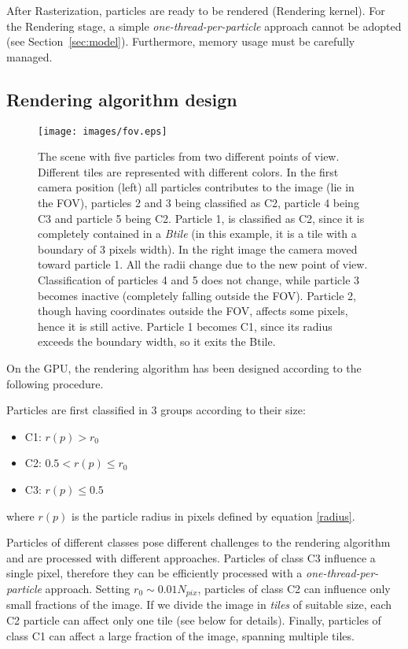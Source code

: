 \documentclass[11pt]{article}
\begin{document}
After Rasterization, particles are ready to be rendered (Rendering kernel).
For the Rendering stage, a simple {\it one-thread-per-particle} approach
cannot be adopted (see Section~\ref{sec:model}). Furthermore, memory usage must be carefully managed.

\subsection{Rendering algorithm design}
\label{sec:design}

\begin{figure}
\centering
\texttt{[image: images/fov.eps]}
\caption{The scene with five particles from two different points of view. Different tiles are 
represented with different colors. In the first camera position
(left) all particles contributes to the image (lie in the FOV), particles 2 and 3
being classified as C2, particle 4 being C3 and particle 5 being C2. Particle 1, is classified
as C2, since it is completely contained in a {\it Btile} (in this example, it is a tile with a boundary of 3 pixels width). In the right
image the camera moved toward particle 1. All the radii change due to the new point
of view. Classification of particles 4 and 5 does not change, while particle 3 
becomes inactive (completely falling outside the FOV). Particle 2, though 
having coordinates outside the FOV, affects some pixels, hence it is still active.
Particle 1 becomes C1, since its radius exceeds the boundary width, so it exits the Btile. 
}
\label{fig:fov}
\end{figure}


On the GPU, the rendering algorithm has been designed according to the following procedure.

Particles are first classified in 3 groups according to their size:
\begin{itemize}
\item 
C1: $r(p) > r_0$
\item
C2: $0.5 < r(p) \le r_0$
\item
C3: $r(p) \le 0.5$
\end{itemize}
where $r(p)$ is the particle radius in pixels defined by equation \eqref{radius}.

Particles of different classes pose different challenges to the rendering 
algorithm and are processed with different approaches. Particles of class C3 
influence a single pixel, therefore they can be efficiently 
processed with a {\it one-thread-per-particle} approach. Setting $r_0 \sim 0.01 N_{pix}$, 
particles of class C2 can influence only small fractions of the image. If 
we divide the image in {\it tiles} of suitable size, each C2 particle can affect 
only one tile (see below for details). Finally, particles of class C1 can affect 
a large fraction of the image, spanning multiple tiles.
\end{document}

